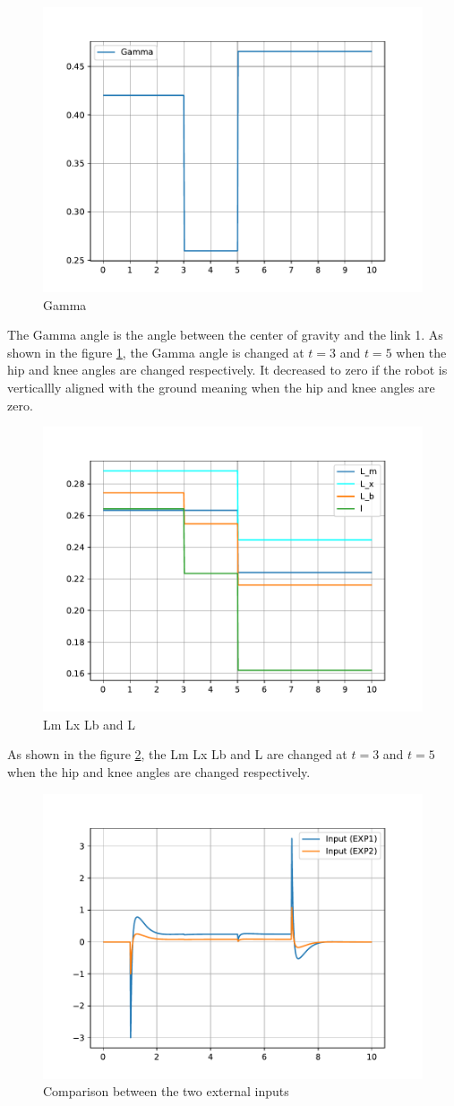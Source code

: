 \begin{figure}[h]
	\centering
	\includegraphics[width=.5\textwidth]{Gamma}
	\caption{Gamma}
	\label{fig:Gamma}
\end{figure}

The Gamma angle is the angle between the center of gravity and the link 1. As shown in the figure \ref{fig:Gamma}, the Gamma angle is changed at $t=3$ and $t=5$ when the hip and knee angles are changed respectively. It decreased to zero if the robot is verticallly aligned with the ground meaning when the hip and knee angles are zero.

\begin{figure}[h]
	\centering
	\includegraphics[width=.5\textwidth]{L_m L_x L_b L}
	\caption{Lm Lx Lb and L}
	\label{fig:Lm Lx Lb and L}
\end{figure}

As shown in the figure \ref{fig:Lm Lx Lb and L}, the Lm Lx Lb and L are changed at $t=3$ and $t=5$ when the hip and knee angles are changed respectively.
\begin{figure}[h]
	\centering
	\includegraphics[width=.5\textwidth]{Comparison between the two external inputs}
	\caption{Comparison between the two external inputs}
	\label{fig:Comparison between the two external inputs}
\end{figure}

